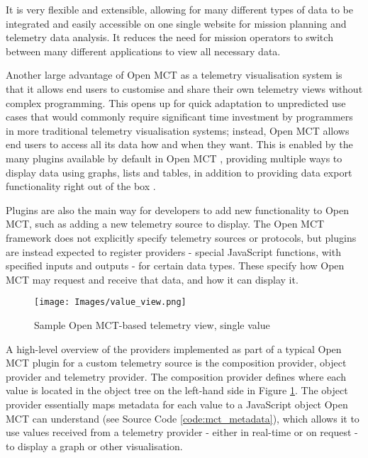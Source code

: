 It is very flexible and extensible, allowing for many different types of data to be integrated and easily accessible on one single website for mission planning and \gls{telemetry} data analysis. It reduces the need for mission operators to switch between many different applications to view all necessary data. \cite{dev_interview, mctos}

Another large advantage of Open MCT as a telemetry visualisation system is that it allows end users to customise and share their own telemetry views without complex programming. This opens up for quick adaptation to unpredicted use cases that would commonly require significant time investment by programmers in more traditional telemetry visualisation systems; instead, Open MCT allows end users to access all its data how and when they want. This is enabled by the many plugins available by default in Open MCT \cite{mctplugins}, providing multiple ways to display data using graphs, lists and tables, in addition to providing data export functionality right out of the box \cite{omct_intro}. 

Plugins are also the main way for developers to add new functionality to Open MCT, such as adding a new telemetry source to display. The Open MCT framework does not explicitly specify telemetry sources or protocols, but plugins are instead expected to register providers - special JavaScript functions, with specified inputs and outputs - for certain data types. These specify how Open MCT may request and receive that data, and how it can display it.

\begin{figure}[H]
    \centering
    \texttt{[image: Images/value\_view.png]}
    \caption{Sample Open MCT-based telemetry view, single value}
    \label{fig:omctvalue}
\end{figure}

A high-level overview of the providers implemented as part of a typical Open MCT plugin for a custom telemetry source is the composition provider, object provider and telemetry provider. The composition provider defines where each value is located in the object tree on the left-hand side in Figure \ref{fig:omctvalue}. The object provider essentially maps metadata for each value to a JavaScript object Open MCT can understand (see Source Code \ref{code:mct_metadata}), which allows it to use values received from a telemetry provider - either in real-time or on request - to display a graph or other visualisation.


